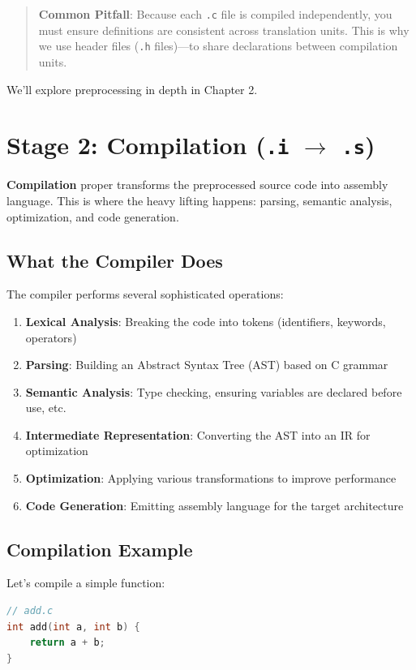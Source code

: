 \begin{quote}
\textbf{Common Pitfall}: Because each \texttt{.c} file is compiled independently, you must ensure definitions are consistent across translation units. This is why we use header files (\texttt{.h} files)—to share declarations between compilation units.
\end{quote}

We'll explore preprocessing in depth in Chapter 2.

\section{Stage 2: Compilation (\texttt{.i} $\to$ \texttt{.s})}

\textbf{Compilation} proper transforms the preprocessed source code into assembly language. This is where the heavy lifting happens: parsing, semantic analysis, optimization, and code generation.

\subsection{What the Compiler Does}

The compiler performs several sophisticated operations:

\begin{enumerate}
    \item \textbf{Lexical Analysis}: Breaking the code into tokens (identifiers, keywords, operators)
    \item \textbf{Parsing}: Building an Abstract Syntax Tree (AST) based on C grammar
    \item \textbf{Semantic Analysis}: Type checking, ensuring variables are declared before use, etc.
    \item \textbf{Intermediate Representation}: Converting the AST into an IR for optimization
    \item \textbf{Optimization}: Applying various transformations to improve performance
    \item \textbf{Code Generation}: Emitting assembly language for the target architecture
\end{enumerate}

\subsection{Compilation Example}

Let's compile a simple function:

\begin{lstlisting}[language=C]
// add.c
int add(int a, int b) {
    return a + b;
}
\end{lstlisting}


